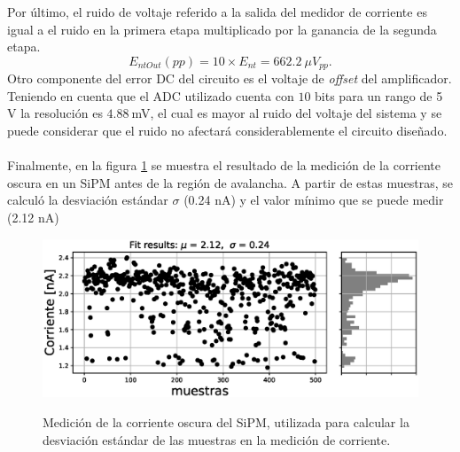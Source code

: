 Por último, el ruido de voltaje referido a la salida del medidor de corriente es igual a el ruido en la primera etapa multiplicado por la ganancia de la segunda etapa.
\begin{equation}
     E_{ntOut}(pp)= 10\times E_{nt}=662.2~\mu V_{pp}.
\end{equation}
Otro componente del error DC del circuito es el voltaje de \textit{offset} del amplificador. Teniendo en cuenta que el ADC utilizado cuenta con $10$ bits para un rango de 5 V la resolución es $4.88~$mV, el cual es mayor al ruido del voltaje del sistema y se puede considerar que el ruido no afectará considerablemente el circuito diseñado.\\ \\
Finalmente, en la figura \ref{fig:Inoise} se muestra el resultado de la medición de la corriente oscura en un SiPM antes de la región de avalancha. A partir de estas muestras, se calculó la desviación estándar $\sigma$ (0.24 nA) y el valor mínimo que se puede medir (2.12 nA)
\begin{figure}[h!]
\begin{centering}
    \caption{Medición de la corriente oscura del SiPM, utilizada para calcular la desviación estándar de las muestras en la medición de corriente.}
    \includegraphics[width=\textwidth]{Images/Inoise.eps}
    \label{fig:Inoise}
  \par\end{centering}
\end{figure}
